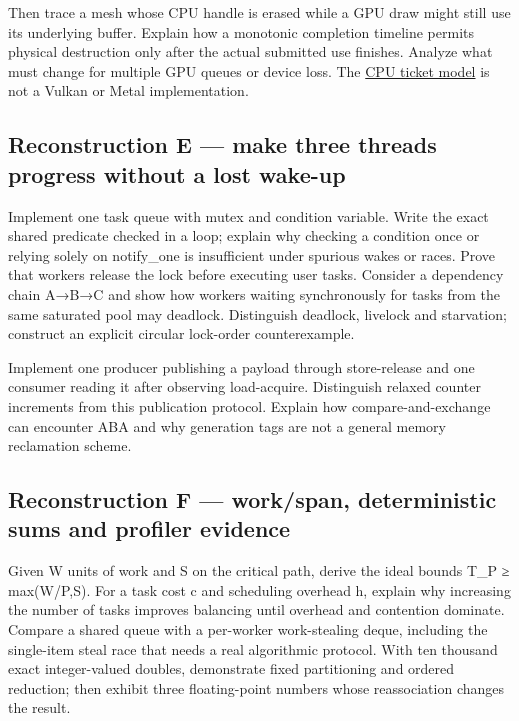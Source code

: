 Then trace a mesh whose CPU handle is erased while a GPU draw might still use its underlying buffer. Explain how a monotonic completion timeline permits physical destruction only after the actual submitted use finishes. Analyze what must change for multiple GPU queues or device loss. The \hyperref[source-file-0060a91bd24dd25d6c14e679]{CPU ticket model} is not a Vulkan or Metal implementation.

\subsection{Reconstruction E --- make three threads progress without a lost wake-up}\label{appendix-2587680a4fe3-reconstruction-e-make-three-threads-progress-without-a-lost-wake-up}

Implement one task queue with mutex and condition variable. Write the exact shared predicate checked in a loop; explain why checking a condition once or relying solely on notify\_one is insufficient under spurious wakes or races. Prove that workers release the lock before executing user tasks. Consider a dependency chain A→B→C and show how workers waiting synchronously for tasks from the same saturated pool may deadlock. Distinguish deadlock, livelock and starvation; construct an explicit circular lock-order counterexample.

Implement one producer publishing a payload through store-release and one consumer reading it after observing load-acquire. Distinguish relaxed counter increments from this publication protocol. Explain how compare-and-exchange can encounter ABA and why generation tags are not a general memory reclamation scheme.

\subsection{Reconstruction F --- work/span, deterministic sums and profiler evidence}\label{appendix-2587680a4fe3-reconstruction-f-workspan-deterministic-sums-and-profiler-evidence}

Given W units of work and S on the critical path, derive the ideal bounds T\_P ≥ max(W/P,S). For a task cost c and scheduling overhead h, explain why increasing the number of tasks improves balancing until overhead and contention dominate. Compare a shared queue with a per-worker work-stealing deque, including the single-item steal race that needs a real algorithmic protocol. With ten thousand exact integer-valued doubles, demonstrate fixed partitioning and ordered reduction; then exhibit three floating-point numbers whose reassociation changes the result.

